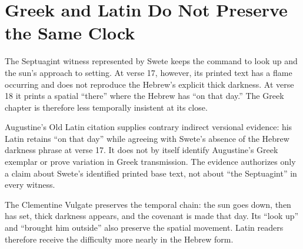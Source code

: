 \section{Greek and Latin Do Not Preserve the Same Clock}

The Septuagint witness represented by Swete keeps the command to look up and
the sun's approach to setting. At verse 17, however, its printed text has a
flame occurring and does not reproduce the Hebrew's explicit thick darkness.
At verse 18 it prints a spatial ``there'' where the Hebrew has ``on that day.''
The Greek chapter is therefore less temporally insistent at its close.

Augustine's Old Latin citation supplies contrary indirect versional evidence:
his Latin retains ``on that day'' while agreeing with Swete's absence of the
Hebrew darkness phrase at verse 17. It does not by itself identify Augustine's
Greek exemplar or prove variation in Greek transmission. The evidence
authorizes only a claim about Swete's identified printed base text, not about
``the Septuagint'' in every witness.

The Clementine Vulgate preserves the temporal chain: the sun goes down, then
has set, thick darkness appears, and the covenant is made that day. Its
``look up'' and ``brought him outside'' also preserve the spatial movement.
Latin readers therefore receive the difficulty more nearly in the Hebrew form.

